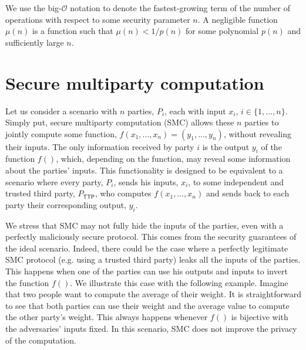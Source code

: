 We use the big-$\mathcal{O}$ notation to denote the fastest-growing term of the number of operations with respect to some security parameter $n$. A negligible function $\mu(n)$ is a function such that $\mu(n) < 1/p(n)$ for some polynomial $p(n)$ and sufficiently large $n$.



\section{Secure multiparty computation}

Let us consider a scenario with $n$ parties, $P_i$, each with input $x_i$, $i\in \{ 1, ..., n\}$. Simply put, secure multiparty computation (SMC) allows these $n$ parties to jointly compute some function, $f( x_1, ..., x_n ) = (y_1, ..., y_n)$, without revealing their inputs. The only information received by party $i$ is the output $y_i$ of the function $f()$, which, depending on the function, may reveal some information about the parties' inputs. This functionality is designed to be equivalent to a scenario where every party, $P_i$, sends his inputs, $x_i$, to some independent and trusted third party, $P_{\mathsf{TTP}}$, who computes $f( x_1, ..., x_n )$ and sends back to each party their corresponding output, $y_i$.

We stress that SMC may not fully hide the inputs of the parties, even with a perfectly maliciously secure protocol. This comes from the security guarantees of the ideal scenario. Indeed, there could be the case where a perfectly legitimate SMC protocol (e.g. using a trusted third party) leaks all the inputs of the parties. This happens when one of the parties can use his outputs and inputs to invert the function $f()$. We illustrate this case with the following example. Imagine that two people want to compute the average of their weight. It is straightforward to see that both parties can use their weight and the average value to compute the other party's weight. This always happens whenever $f()$ is bijective with the adversaries' inputs fixed. In this scenario, SMC does not improve the privacy of the computation. 
%

